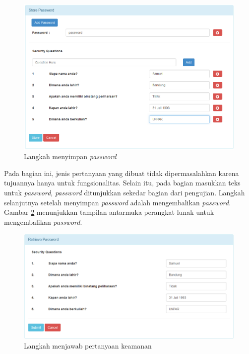 \begin{figure}[H]
	\includegraphics[scale=0.5]{Gambar/simpan_password}
	\centering
	\caption{Langkah menyimpan \textit{password}}\label{fig:simpan_password}
\end{figure}

Pada bagian ini, jenis pertanyaan yang dibuat tidak dipermasalahkan karena tujuannya hanya untuk fungsionalitas. Selain itu, pada bagian masukkan teks untuk \textit{password}, \textit{password} ditunjukkan sekedar bagian dari pengujian. Langkah selanjutnya setelah menyimpan \textit{password} adalah mengembalikan \textit{password}. Gambar \ref{fig:balik_password_sukses} menunjukkan tampilan antarmuka perangkat lunak untuk mengembalikan \textit{password}.

\begin{figure}[H]
	\includegraphics[scale=0.5]{Gambar/balik_password_sukses}
	\centering
	\caption{Langkah menjawab pertanyaan keamanan}\label{fig:balik_password_sukses}
\end{figure}

